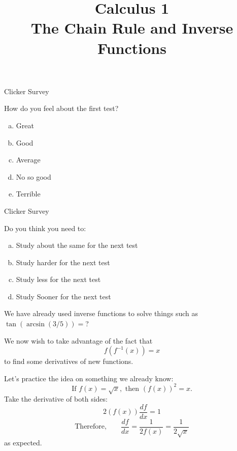 \documentclass{beamer}
\begin{document}
\title[Inverse Functions]{Calculus 1 \\ The Chain Rule and Inverse Functions}  
\date{} 

\begin{frame}{Clicker Survey}

How do you feel about the first test?

\begin{enumerate}[(a)]
 \item Great
 \item Good
 \item Average
 \item No so good
 \item Terrible
\end{enumerate}

 
\end{frame}
\begin{frame}{Clicker Survey}

Do you think you need to:

\begin{enumerate}[(a)]
\item Study about the same for the next test

\item Study harder for the next test

\item Study less for the next test

\item Study Sooner for the next test
\end{enumerate}
 
\end{frame}
\begin{frame}{}

We have already used inverse functions to solve things such as $\tan(\arcsin(3/5))=$?

We now wish to take advantage of the fact that \[f(f^{-1}(x))=x\] to find some derivatives of new functions.

Let's practice the idea on something we already know: 
\[\text{If }f(x) = \sqrt{x},\text{ then }(f(x))^2 = x.\]
Take the derivative of both sides:
\[2(f(x))\frac{df}{dx} = 1\]
\[\text{Therefore,}\qquad\frac{df}{dx} = \frac{1}{2f(x)} = \frac{1}{2\sqrt{x}}\]
as expected.
\end{frame}
\end{document}
